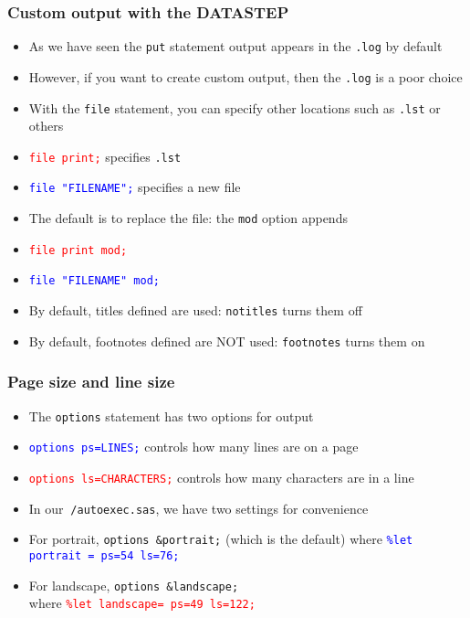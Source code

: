 \documentclass[11pt,pdftex,dvipsnames,usenames,helvetica]{beamer}
\begin{document}
\begin{frame}[fragile]
\frametitle{Custom output with the DATASTEP}
\begin{itemize}
\item As we have seen the {\tt put} statement output appears in the {\tt .log}
by default
\item However, if you want to create custom output, then the {\tt .log} is
a poor choice
\item With the {\tt file} statement, you can specify other locations such 
as {\tt .lst} or others
\item \textcolor{red}{\tt file print;} specifies {\tt .lst}
\item \textcolor{blue}{\tt file "FILENAME";} specifies a new file
\item The default is to replace the file: the {\tt mod} option appends
\item \textcolor{red}{\tt file print mod;} 
\item \textcolor{blue}{\tt file "FILENAME" mod;} 
\item By default, titles defined are used: {\tt notitles} turns them off
\item By default, footnotes defined are NOT used: {\tt footnotes} turns them on
\end{itemize}

\end{frame}

\begin{frame}[fragile]
\frametitle{Page size and line size}
\begin{itemize}
\item The {\tt options} statement has two options for output
\item \textcolor{blue}{\tt options ps=LINES;} controls how many lines
  are on a page
\item \textcolor{red}{\tt options ls=CHARACTERS;} controls how many
  characters are in a line
\item In our {\tt $~$/autoexec.sas}, we have two settings for convenience
\item For portrait, {\tt options \&portrait;} (which is the default)
where \textcolor{blue}{\tt \%let portrait = ps=54 ls=76;}
\item For landscape, {\tt options \&landscape;} \\
where \textcolor{red}{\tt \%let landscape= ps=49 ls=122;}
\end{itemize}

\end{frame}
\end{document}

